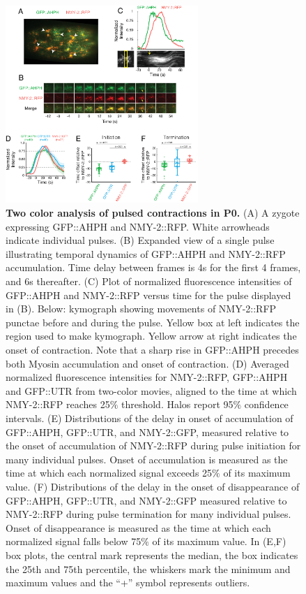 \begin{figure}[!htbp]
\centering
\includegraphics[width=0.65\textwidth]{pulse/Figure2-14}

\caption[Two color analysis of pulsed contractions in P0.]{\label{fig:2214} \textbf{Two color analysis of pulsed contractions in P0.} (A) A zygote expressing GFP::AHPH and NMY-2::RFP. White arrowheads indicate individual pulses. (B) Expanded view of a single pulse illustrating temporal dynamics of GFP::AHPH and NMY-2::RFP accumulation. Time delay between frames is 4s for the first 4 frames, and 6s thereafter. (C) Plot of normalized fluorescence intensities of GFP::AHPH and NMY-2::RFP versus time for the pulse displayed in (B). Below: kymograph showing movements of NMY-2::RFP punctae before and during the pulse. Yellow box at left indicates the region used to make kymograph. Yellow arrow at right indicates the onset of contraction. Note that a sharp rise in GFP::AHPH precedes both Myosin accumulation and onset of contraction. (D) Averaged normalized fluorescence intensities for NMY-2::RFP, GFP::AHPH and GFP::UTR from two-color movies, aligned to the time at which NMY-2::RFP reaches 25$\%$ threshold. Halos report 95$\%$ confidence intervals. (E) Distributions of the delay in onset of accumulation of GFP::AHPH, GFP::UTR, and NMY-2::GFP, measured relative to the onset of accumulation of NMY-2::RFP during pulse initiation for many individual pulses. Onset of accumulation is measured as the time at which each normalized signal exceeds 25$\%$ of its maximum value. (F) Distributions of the delay in the onset of disappearance of GFP::AHPH, GFP::UTR, and NMY-2::GFP measured relative to NMY-2::RFP during pulse termination for many individual pulses. Onset of disappearance is measured as the time at which each normalized signal falls below 75$\%$ of its maximum value. In (E,F) box plots, the central mark represents the median, the box indicates the 25th and 75th percentile, the whiskers mark the minimum and maximum values and the ``+'' symbol represents outliers.}
\end{figure}






